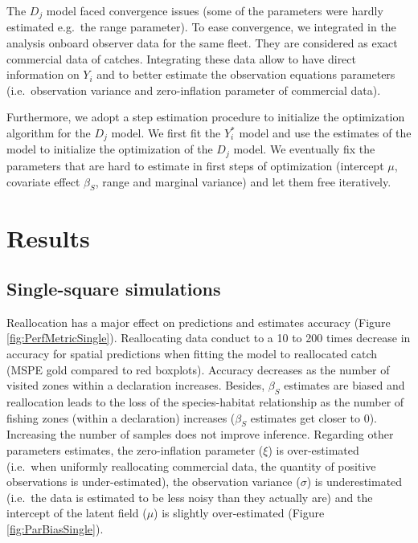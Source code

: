 \documentclass[
  english,
  man,floatsintext]{apa6}
\begin{document}
The \(D_j\) model faced convergence issues (some of the parameters were hardly estimated e.g.~the range parameter). To ease convergence, we integrated in the analysis onboard observer data for the same fleet. They are considered as exact commercial data of catches. Integrating these data allow to have direct information on \(Y_i\) and to better estimate the observation equations parameters (i.e.~observation variance and zero-inflation parameter of commercial data).

Furthermore, we adopt a step estimation procedure to initialize the optimization algorithm for the \(D_j\) model. We first fit the \(Y^*_i\) model and use the estimates of the model to initialize the optimization of the \(D_j\) model. We eventually fix the parameters that are hard to estimate in first steps of optimization (intercept \(\mu\), covariate effect \(\beta_S\), range and marginal variance) and let them free iteratively.

\hypertarget{results}{%
\section{Results}\label{results}}

\hypertarget{single-square-simulations}{%
\subsection{Single-square simulations}\label{single-square-simulations}}

Reallocation has a major effect on predictions and estimates accuracy (Figure \ref{fig:PerfMetricSingle}). Reallocating data conduct to a 10 to 200 times decrease in accuracy for spatial predictions when fitting the model to reallocated catch (MSPE gold compared to red boxplots). Accuracy decreases as the number of visited zones within a declaration increases. Besides, \(\beta_S\) estimates are biased and reallocation leads to the loss of the species-habitat relationship as the number of fishing zones (within a declaration) increases (\(\beta_S\) estimates get closer to 0). Increasing the number of samples does not improve inference. Regarding other parameters estimates, the zero-inflation parameter (\(\xi\)) is over-estimated (i.e.~when uniformly reallocating commercial data, the quantity of positive observations is under-estimated), the observation variance (\(\sigma\)) is underestimated (i.e.~the data is estimated to be less noisy than they actually are) and the intercept of the latent field (\(\mu\)) is slightly over-estimated (Figure \ref{fig:ParBiasSingle}).
\end{document}
